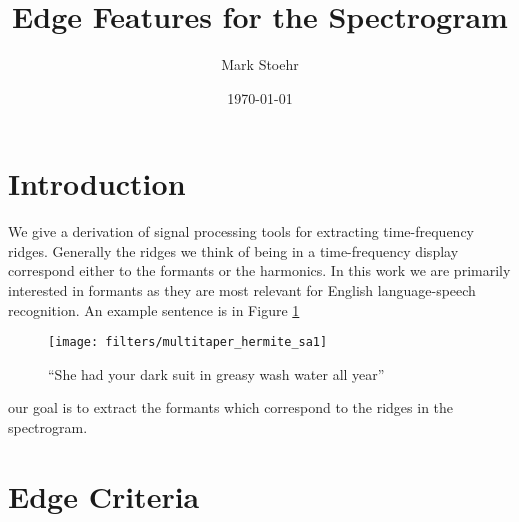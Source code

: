 \documentclass[english]{article}
\title{Edge Features for the Spectrogram}
\author{Mark Stoehr}
\date{\today}
\begin{document}
\maketitle
\tableofcontents

\section{Introduction}

We give a derivation of signal processing tools for extracting time-frequency
ridges. Generally the ridges we think of being in a time-frequency
display correspond either to the formants or the harmonics. In this
work we are primarily interested in formants as they are most relevant
for English language-speech recognition. An example sentence is in
Figure \ref{fig-sa1}
\begin{figure}
\centering{}\texttt{[image: filters/multitaper\_hermite\_sa1]}\caption{``She had your dark suit in greasy wash water all year''\label{fig-sa1}}
\end{figure}
our goal is to extract the formants which correspond to the ridges
in the spectrogram.

\section{Edge Criteria}
\end{document}
